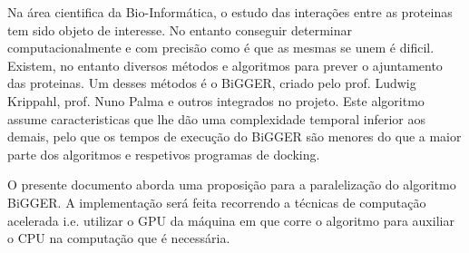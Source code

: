 


%
%
Na área cientifica da Bio-Informática, o estudo das interações entre as proteinas tem sido objeto de interesse. 
No entanto conseguir determinar computacionalmente e com precisão como é que as mesmas se unem é dificil. 
Existem, no entanto diversos métodos e algoritmos para prever o ajuntamento das proteinas. 
Um desses métodos é o BiGGER, criado pelo prof. Ludwig Krippahl, prof. Nuno Palma e outros integrados no projeto. 
Este algoritmo assume caracteristicas que lhe dão uma complexidade temporal inferior aos demais, pelo que os tempos de execução do BiGGER são menores do que a maior parte dos algoritmos e respetivos programas de docking.

O presente documento aborda uma proposição para a paralelização do algoritmo BiGGER.
 A implementação será feita recorrendo a técnicas de computação acelerada i.e. utilizar o GPU da máquina em que corre o algoritmo para auxiliar o CPU na computação que é necessária. 
 
